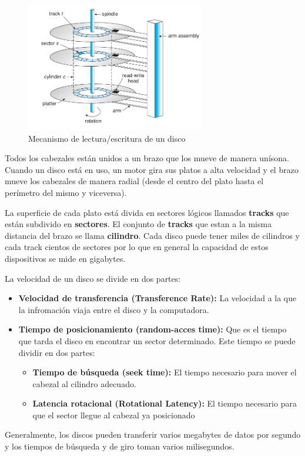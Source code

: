 \begin{figure}[h]
	\centering
	\includegraphics[width=0.7\textwidth]{imagenes/mecanismo-lectura-disco}
	\caption{Mecanismo de lectura/escritura de un disco}
	\label{fig:mecanismo-lectura-disco}
\end{figure}

Todos los cabezales están unidos a un brazo que los mueve de manera unísona. Cuando un disco está en uso, un motor gira sus platos a alta velocidad y el brazo mueve los cabezales de manera radial (desde el centro del plato hasta el perímetro del mismo y viceversa).

La superficie de cada plato está divida en sectores lógicos llamados \textbf{tracks} que están subdivido en \textbf{sectores}. El conjunto de \textbf{tracks} que estan a la misma distancia del brazo se llama \textbf{cilindro}. Cada disco puede tener miles de cilindros y cada track cientos de sectores por lo que en general la capacidad de estos dispositivos se mide en gigabytes.

La velocidad de un disco se divide en dos partes:
\begin{itemize}
	\item \textbf{Velocidad de transferencia (Transference Rate):} La velocidad a la que la infromación viaja entre el disco y la computadora.
	\item \textbf{Tiempo de posicionamiento (random-acces time):} Que es el tiempo que tarda el disco en encontrar un sector determinado. Este tiempo se puede dividir en dos partes:
	\begin{itemize}
		\item \textbf{Tiempo de búsqueda (seek time):} El tiempo necesario para mover el cabezal al cilindro adecuado.
		\item \textbf{Latencia rotacional (Rotational Latency):} El tiempo necesario para que el sector llegue al cabezal ya posicionado
	\end{itemize}
\end{itemize}
Generalmente, los discos pueden transferir varios megabytes de datos por segundo y los tiempos de búsqueda y de giro toman varios milisegundos.

